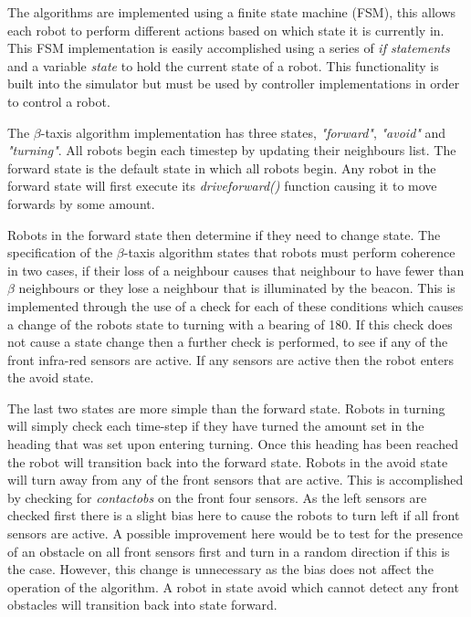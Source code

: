 \documentclass[conference]{IEEEtran}
\begin{document}
The algorithms are implemented using a finite state machine (FSM), this allows each robot to perform different actions based on which state it is currently in. This FSM implementation is easily accomplished using a series of \textit{if statements} and a variable \textit{state} to hold the current state of a robot. This functionality is built into the simulator but must be used by controller implementations in order to control a robot.

The $\beta$-taxis algorithm implementation has three states, \textit{"forward"}, \textit{"avoid"} and \textit{"turning"}. All robots begin each timestep by updating their neighbours list. The forward state is the default state in which all robots begin. Any robot in the forward state will first execute its \textit{driveforward()} function causing it to move forwards by some amount. 

Robots in the forward state then determine if they need to change state. The specification of the $\beta$-taxis algorithm states that robots must perform coherence in two cases, if their loss of a neighbour causes that neighbour to have fewer than $\beta$ neighbours or they lose a neighbour that is illuminated by the beacon. This is implemented through the use of a check for each of these conditions which causes a change of the robots state to turning with a bearing of 180\degree{}. If this check does not cause a state change then a further check is performed, to see if any of the front infra-red sensors are active. If any sensors are active then the robot enters the avoid state. 

The last two states are more simple than the forward state. Robots in turning will simply check each time-step if they have turned the amount set in the heading that was set upon entering turning. Once this heading has been reached the robot will transition back into the forward state. Robots in the avoid state will turn away from any of the front sensors that are active. This is accomplished by checking for \textit{contactobs} on the front four sensors. As the left sensors are checked first there is a slight bias here to cause the robots to turn left if all front sensors are active. A possible improvement here would be to test for the presence of an obstacle on all front sensors first and turn in a random direction if this is the case. However, this change is unnecessary as the bias does not affect the operation of the algorithm. A robot in state avoid which cannot detect any front obstacles will transition back into state forward.
\end{document}
